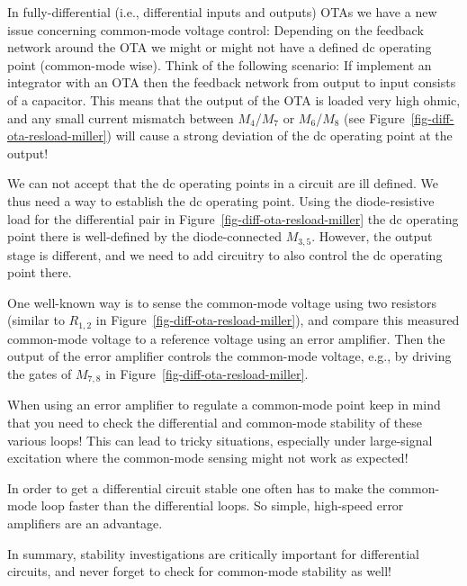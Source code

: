 \documentclass[
  a4paper,
  DIV=11,
  numbers=noendperiod]{scrartcl}
\begin{document}
In fully-differential (i.e., differential inputs and outputs) OTAs we
have a new issue concerning common-mode voltage control: Depending on
the feedback network around the OTA we might or might not have a defined
dc operating point (common-mode wise). Think of the following scenario:
If implement an integrator with an OTA then the feedback network from
output to input consists of a capacitor. This means that the output of
the OTA is loaded very high ohmic, and any small current mismatch
between \(M_4\)/\(M_7\) or \(M_6\)/\(M_8\) (see
Figure~\ref{fig-diff-ota-resload-miller}) will cause a strong deviation
of the dc operating point at the output!

We can not accept that the dc operating points in a circuit are ill
defined. We thus need a way to establish the dc operating point. Using
the diode-resistive load for the differential pair in
Figure~\ref{fig-diff-ota-resload-miller} the dc operating point there is
well-defined by the diode-connected \(M_{3,5}\). However, the output
stage is different, and we need to add circuitry to also control the dc
operating point there.

One well-known way is to sense the common-mode voltage using two
resistors (similar to \(R_{1,2}\) in
Figure~\ref{fig-diff-ota-resload-miller}), and compare this measured
common-mode voltage to a reference voltage using an error amplifier.
Then the output of the error amplifier controls the common-mode voltage,
e.g., by driving the gates of \(M_{7,8}\) in
Figure~\ref{fig-diff-ota-resload-miller}.

\begin{tcolorbox}[enhanced jigsaw, colframe=quarto-callout-important-color-frame, breakable, title=\textcolor{quarto-callout-important-color}{\faExclamation}\hspace{0.5em}{Differential and Common-Mode Loops}, titlerule=0mm, coltitle=black, arc=.35mm, colback=white, opacitybacktitle=0.6, leftrule=.75mm, toptitle=1mm, left=2mm, bottomrule=.15mm, bottomtitle=1mm, rightrule=.15mm, opacityback=0, toprule=.15mm, colbacktitle=quarto-callout-important-color!10!white]

When using an error amplifier to regulate a common-mode point keep in
mind that you need to check the differential and common-mode stability
of these various loops! This can lead to tricky situations, especially
under large-signal excitation where the common-mode sensing might not
work as expected!

In order to get a differential circuit stable one often has to make the
common-mode loop faster than the differential loops. So simple,
high-speed error amplifiers are an advantage.

In summary, stability investigations are critically important for
differential circuits, and never forget to check for common-mode
stability as well!

\end{tcolorbox}
\end{document}
